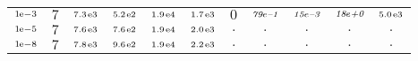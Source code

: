 \begin{tiny}
\begin{tabular}{@{$\;$}c@{$\;$}|@{$\;$}c@{$\;$}@{$\;$}c@{$\;$}@{$\;$}c@{$\;$}@{$\;$}c@{$\;$}@{$\;$}c@{$\;$}|@{$\;$}c@{$\;$}@{$\;$}c@{$\;$}@{$\;$}c@{$\;$}@{$\;$}c@{$\;$}@{$\;$}c@{$\;$}}
$\scriptstyle1\!\mathrm{\hspace{0.10em}e}-3$ & $\scriptstyle7$ & $\scriptstyle7.3\mathrm{\hspace{0.10em}e}3$ & $\scriptstyle5.2\mathrm{\hspace{0.10em}e}2$ & $\scriptstyle1.9\mathrm{\hspace{0.10em}e}4$ & $\scriptstyle1.7\mathrm{\hspace{0.10em}e}3$ & $\scriptstyle0$ & $\scriptstyle\textit{79}\hspace{0.00em}e\textit{--1}$ & $\scriptstyle\textit{15}\hspace{0.00em}e\textit{--3}$ & $\scriptstyle\textit{18}\hspace{0.00em}e\textit{+0}$ & $\scriptstyle5.0\mathrm{\hspace{0.10em}e}3$\\ 
$\scriptstyle1\!\mathrm{\hspace{0.10em}e}-5$ & $\scriptstyle7$ & $\scriptstyle7.6\mathrm{\hspace{0.10em}e}3$ & $\scriptstyle7.6\mathrm{\hspace{0.10em}e}2$ & $\scriptstyle1.9\mathrm{\hspace{0.10em}e}4$ & $\scriptstyle2.0\mathrm{\hspace{0.10em}e}3$ & $\scriptstyle.$ & $\scriptstyle.$ & $\scriptstyle.$ & $\scriptstyle.$ & $\scriptstyle.$\\ 
$\scriptstyle1\!\mathrm{\hspace{0.10em}e}-8$ & $\scriptstyle7$ & $\scriptstyle7.8\mathrm{\hspace{0.10em}e}3$ & $\scriptstyle9.6\mathrm{\hspace{0.10em}e}2$ & $\scriptstyle1.9\mathrm{\hspace{0.10em}e}4$ & $\scriptstyle2.2\mathrm{\hspace{0.10em}e}3$ & $\scriptstyle.$ & $\scriptstyle.$ & $\scriptstyle.$ & $\scriptstyle.$ & $\scriptstyle.$\\ 
\end{tabular} 
\end{tiny} 
